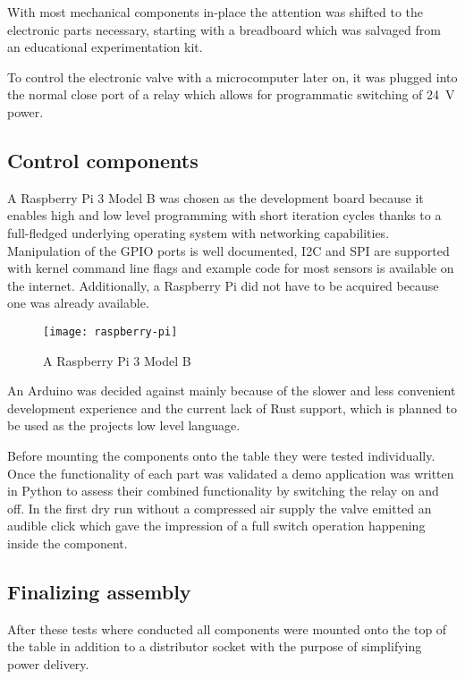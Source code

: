 With most mechanical components in-place the attention was shifted to the electronic parts necessary, starting with a breadboard which was salvaged from an educational experimentation kit. 

To control the electronic valve with a microcomputer later on, it was plugged into the normal close port of a relay which allows for programmatic switching of \SI{24}{\volt} power. 

\subsection{Control components}
A Raspberry Pi 3 Model B \cite{raspberry-pi} was chosen as the development board because it enables high and low level programming with short iteration cycles thanks to a full-fledged underlying operating system \cite{raspbian} with networking capabilities. Manipulation of the GPIO ports is well documented, I2C and SPI are supported with kernel command line flags and example code for most sensors is available on the internet. Additionally, a Raspberry Pi did not have to be acquired because one was already available.

\begin{figure}[h]
\centering

\texttt{[image: raspberry-pi]}

\caption{A Raspberry Pi 3 Model B}
\end{figure}

An Arduino was decided against mainly because of the slower and less convenient development experience and the current lack of Rust \cite{rust} support, which is planned to be used as the projects low level language.

Before mounting the components onto the table they were tested individually. Once the functionality of each part was validated a demo application was written in Python to assess their combined functionality by switching the relay on and off. In the first dry run without a compressed air supply the valve emitted an audible click which gave the impression of a full switch operation happening inside the component.

\subsection{Finalizing assembly}
After these tests where conducted all components were mounted onto the top of the table in addition to a distributor socket with the purpose of simplifying power delivery.

